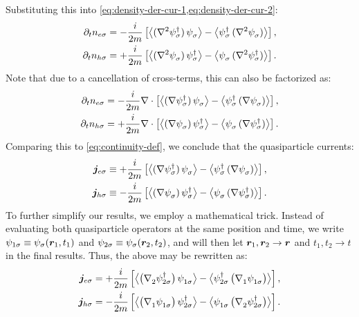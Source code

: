 Substituting this into \cref{eq:density-der-cur-1,eq:density-der-cur-2}:
\begin{align}
  \p t n_{e\sigma} &=
  -\frac{i}{2m} 
  \left[ \avg[\big]{(\nabla^2 \hc{\psi_{\sigma}})\, \pc{\psi_{\sigma}}} -
         \avg[\big]{\hc{\psi_{\sigma}}\, (\nabla^2 \pc{\psi_{\sigma}})} \right], \\
  \p t n_{h\sigma} &=
  +\frac{i}{2m} 
  \left[ \avg[\big]{(\nabla^2 \pc{\psi_{\sigma}})\, \hc{\psi_{\sigma}}} -
         \avg[\big]{\pc{\psi_{\sigma}}\, (\nabla^2 \hc{\psi_{\sigma}})} \right]. 
\end{align}
Note that due to a cancellation of cross-terms, this can also be factorized as:
\begin{align}
  \p t n_{e\sigma} &=
  -\frac{i}{2m} \nabla \cdot 
  \left[ \avg[\big]{(\nabla \hc{\psi_{\sigma}})\, \pc{\psi_{\sigma}}} -
         \avg[\big]{\hc{\psi_{\sigma}}\, (\nabla \pc{\psi_{\sigma}})} \right], \\
  \p t n_{h\sigma} &=
  +\frac{i}{2m} \nabla \cdot
  \left[ \avg[\big]{(\nabla \pc{\psi_{\sigma}})\, \hc{\psi_{\sigma}}} -
         \avg[\big]{\pc{\psi_{\sigma}}\, (\nabla \hc{\psi_{\sigma}})} \right].
\end{align}
Comparing this to \cref{eq:continuity-def}, we conclude that the quasiparticle currents:
\begin{align}
  \B{j}_{e\sigma} &\equiv
  +\frac{i}{2m} 
  \left[ \avg[\big]{(\nabla \hc{\psi_{\sigma}})\, \pc{\psi_{\sigma}}} -
         \avg[\big]{\hc{\psi_{\sigma}}\, (\nabla \pc{\psi_{\sigma}})} \right], \\
  \B{j}_{h\sigma} &\equiv
  -\frac{i}{2m}
  \left[ \avg[\big]{(\nabla \pc{\psi_{\sigma}})\, \hc{\psi_{\sigma}}} -
         \avg[\big]{\pc{\psi_{\sigma}}\, (\nabla \hc{\psi_{\sigma}})} \right].
\end{align}
To further simplify our results, we employ a mathematical trick.
Instead of evaluating both quasiparticle operators at the same position and time, we write $\psi_{1 \sigma} \equiv \psi_\sigma(\bm{r}_1,t_1)$ and $\psi_{2 \sigma} \equiv \psi_\sigma(\bm{r}_2,t_2)$, and will then let $\bm{r}_1,\bm{r}_2 \rightarrow \bm{r}$ and $t_1,t_2 \rightarrow t$ in the final results.
Thus, the above may be rewritten as:
\begin{align}
  \B{j}_{e\sigma} &=
  +\frac{i}{2m} 
  \left[ \avg[\big]{\big(\pc{\nabla_2} \hc{\psi_{2 \sigma}}\big)\, \pc{\psi_{1 \sigma}}} -
  \avg[\big]{\hc{\psi_{2 \sigma}}\, \big(\pc{\nabla_1} \pc{\psi_{1 \sigma}}\big)} \right], \\
  \B{j}_{h\sigma} &=
  -\frac{i}{2m}
  \left[ \avg[\big]{\big(\pc{\nabla_1} \pc{\psi_{1 \sigma}}\big)\, \hc{\psi_{2 \sigma}}} -
  \avg[\big]{\pc{\psi_{1 \sigma}}\, \big(\pc{\nabla_2} \hc{\psi_{2 \sigma}}\big)} \right].
\end{align}
